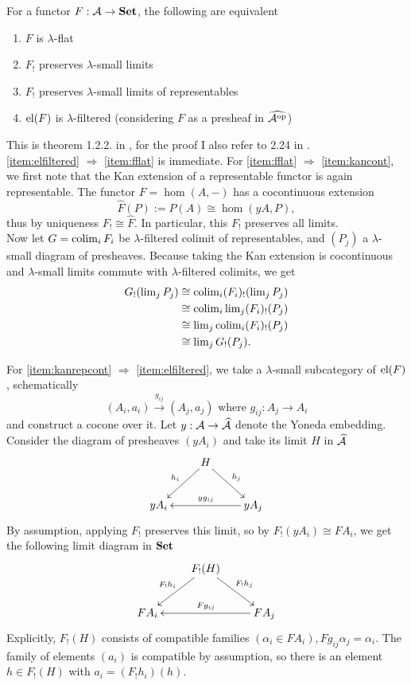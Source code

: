 \begin{Proposition}\label{prop:flat}
For a functor $F : \mathcal{A} \to \mathbf{Set}$, the following are equivalent
\begin{enumerate}
\item $F$ is $\lambda$-flat \label{item:fflat}
\item $F_!$ preserves $\lambda$-small limits \label{item:kancont}
\item $F_!$ preserves $\lambda$-small limits of representables \label{item:kanrepcont}
\item $\textrm{el}(F)$ is $\lambda$-filtered (considering $F$ as a presheaf in $\widehat{\mathcal{A}^{\textrm{op}}}$) \label{item:elfiltered}
\end{enumerate}
\end{Proposition}
\begin{Proof}
This is theorem 1.2.2. in \cite{MakkaiPare}, for the proof I also refer to 2.24 in \cite{AdamekRosicky}. \\

\ref{item:elfiltered} $\Rightarrow$ \ref{item:fflat} is immediate. For \ref{item:fflat} $\Rightarrow$ \ref{item:kancont}, we first note that the Kan extension of a representable functor is again representable. The functor $F=\hom(A,-)$ has a cocontinuous extension \[ \widehat F(P) := P(A) \cong \hom(yA,P), \]
thus by uniqueness $F_! \cong \widehat F$. In particular, this $F_!$ preserves all limits. \\

Now let $G = \operatorname{colim}_i F_i$ be $\lambda$-filtered colimit of representables, and $(P_j)$ a $\lambda$-small diagram of presheaves. Because taking the Kan extension is cocontinuous and $\lambda$-small limits commute with $\lambda$-filtered colimits, we get
\begin{align*}
G_!(\operatorname{lim}_j P_j) &\cong \operatorname{colim}_i (F_i)_!(\operatorname{lim}_j P_j) \\
&\cong \operatorname{colim}_i \operatorname{lim}_j (F_i)_!(P_j) \\
&\cong \operatorname{lim}_j  \operatorname{colim}_i (F_i)_!(P_j) \\
&\cong \operatorname{lim}_j G_!(P_j).
\end{align*}

For \ref{item:kanrepcont} $\Rightarrow$ \ref{item:elfiltered}, we take a $\lambda$-small subcategory of $\textrm{el}(F)$, schematically
\[ (A_i,a_i) \xrightarrow{g_{ij}} (A_j,a_j) \text{ where } g_{ij} : A_j \to A_i \]
and construct a cocone over it. Let $y : \mathcal{A} \to \widehat{\mathcal{A}}$ denote the Yoneda embedding. Consider the diagram of presheaves $(yA_i)$ and take its limit $H$ in $\widehat{\mathcal{A}}$
\[
\xymatrix{
& H \ar[ld]_{h_i} \ar[rd]^{h_j} \\
yA_i & & yA_j \ar[ll]_{yg_{ij}}
}\]
By assumption, applying $F_!$ preserves this limit, so by $F_!(yA_i) \cong FA_i$, we get the following limit diagram in $\mathbf{Set}$
\[
\xymatrix{
& F_!(H) \ar[ld]_{F_!h_i} \ar[rd]^{F_!h_j} \\
FA_i & & FA_j \ar[ll]_{Fg_{ij}}
}\]
Explicitly, $F_!(H)$ consists of compatible families $(\alpha_i \in FA_i), Fg_{ij}\alpha_j = \alpha_i$. The family of elements $(a_i)$ is compatible by assumption, so there is an element $h \in F_!(H)$ with $a_i = (F_!h_i)(h)$. \\


\end{Proof}
